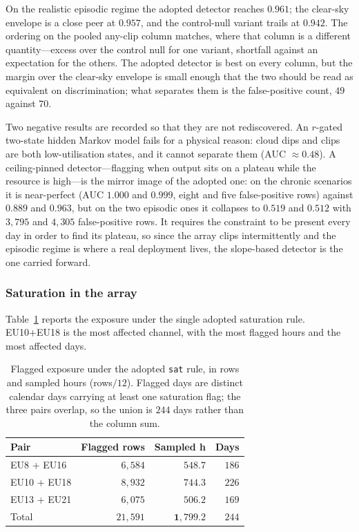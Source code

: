 On the realistic episodic regime the adopted detector reaches $0.961$; the clear-sky envelope is a close peer at $0.957$, and the control-null variant trails at $0.942$. The ordering on the pooled any-clip column matches, where that column is a different quantity---excess over the control null for one variant, shortfall against an expectation for the others. The adopted detector is best on every column, but the margin over the clear-sky envelope is small enough that the two should be read as equivalent on discrimination; what separates them is the false-positive count, $49$ against $70$.

Two negative results are recorded so that they are not rediscovered. An $r$-gated two-state hidden Markov model fails for a physical reason: cloud dips and clips are both low-utilisation states, and it cannot separate them (AUC $\approx 0.48$). A ceiling-pinned detector---flagging when output sits on a plateau while the resource is high---is the mirror image of the adopted one: on the chronic scenarios it is near-perfect (AUC $1.000$ and $0.999$, eight and five false-positive rows) against $0.889$ and $0.963$, but on the two episodic ones it collapses to $0.519$ and $0.512$ with $3{,}795$ and $4{,}305$ false-positive rows. It requires the constraint to be present every day in order to find its plateau, so since the array clips intermittently and the episodic regime is where a real deployment lives, the slope-based detector is the one carried forward.

\subsubsection{Saturation in the array}
\label{sss:mppt_results}

Table~\ref{tab:mppt_hours} reports the exposure under the single adopted saturation rule. EU10+EU18 is the most affected channel, with the most flagged hours and the most affected days.

\begin{table}[!t]
  \renewcommand{\arraystretch}{1.3}
  \centering
  \caption{Flagged exposure under the adopted \texttt{sat} rule, in rows and sampled hours (rows${}/{}12$). Flagged days are distinct calendar days carrying at least one saturation flag; the three pairs overlap, so the union is $244$ days rather than the column sum.}
  \label{tab:mppt_hours}
  \small
  \setlength{\tabcolsep}{6pt}
  \begin{tabular}{@{}lrrr@{}}
    \toprule
    Pair & Flagged rows & Sampled h & Days \\
    \midrule
    EU8 + EU16   & $6{,}584$ & $548.7$ & $186$ \\
    EU10 + EU18  & $8{,}932$ & $744.3$ & $226$ \\
    EU13 + EU21  & $6{,}075$ & $506.2$ & $169$ \\
    \midrule
    Total & $21{,}591$ & $\mathbf{1{,}799.2}$ & $244$ \\
    \bottomrule
  \end{tabular}
\end{table}

